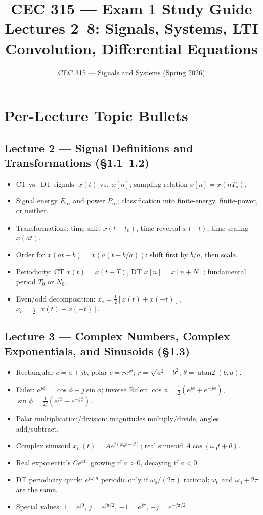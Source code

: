 \documentclass[11pt]{article}
\title{CEC 315 --- Exam 1 Study Guide\\\large Lectures 2--8: Signals, Systems, LTI Convolution, Differential Equations}
\author{CEC 315 --- Signals and Systems (Spring 2026)}
\date{}
\begin{document}
\maketitle
\tableofcontents
\newpage

\section{Per-Lecture Topic Bullets}

\subsection{Lecture 2 --- Signal Definitions and Transformations (\S 1.1--1.2)}
\begin{itemize}[leftmargin=*]
    \item CT vs.\ DT signals: $x(t)$ vs.\ $x[n]$; sampling relation $x[n] = x(nT_s)$.
    \item Signal energy $E_\infty$ and power $P_\infty$; classification into finite-energy, finite-power, or neither.
    \item Transformations: time shift $x(t-t_0)$, time reversal $x(-t)$, time scaling $x(at)$.
    \item Order for $x(at-b) = x(a(t-b/a))$: shift first by $b/a$, then scale.
    \item Periodicity: CT $x(t)=x(t+T)$, DT $x[n]=x[n+N]$; fundamental period $T_0$ or $N_0$.
    \item Even/odd decomposition: $x_e = \tfrac{1}{2}[x(t)+x(-t)]$, $x_o = \tfrac{1}{2}[x(t)-x(-t)]$.
\end{itemize}

\subsection{Lecture 3 --- Complex Numbers, Complex Exponentials, and Sinusoids (\S 1.3)}
\begin{itemize}[leftmargin=*]
    \item Rectangular $c = a+jb$, polar $c = re^{j\theta}$; $r = \sqrt{a^2+b^2}$, $\theta = \operatorname{atan2}(b,a)$.
    \item Euler: $e^{j\phi} = \cos\phi + j\sin\phi$; inverse Euler:
    $\cos\phi = \tfrac{1}{2}(e^{j\phi}+e^{-j\phi})$, $\sin\phi = \tfrac{1}{2j}(e^{j\phi}-e^{-j\phi})$.
    \item Polar multiplication/division: magnitudes multiply/divide, angles add/subtract.
    \item Complex sinusoid $x_C(t) = Ae^{j(\omega_0 t + \theta)}$; real sinusoid $A\cos(\omega_0 t + \theta)$.
    \item Real exponentials $Ce^{at}$: growing if $a>0$, decaying if $a<0$.
    \item DT periodicity quirk: $e^{j\omega_0 n}$ periodic only if $\omega_0/(2\pi)$ rational; $\omega_0$ and $\omega_0 + 2\pi$ are the same.
    \item Special values: $1 = e^{j0}$, $j = e^{j\pi/2}$, $-1 = e^{j\pi}$, $-j = e^{-j\pi/2}$.
\end{itemize}
\end{document}
